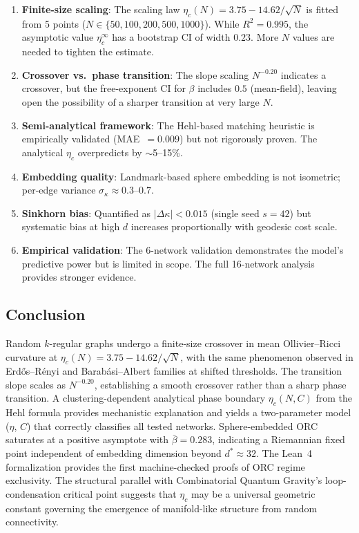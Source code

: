 \documentclass[11pt,a4paper]{article}
\newcommand{\etac}{\eta_c}
\begin{document}
\begin{enumerate}
    \item \textbf{Finite-size scaling}: The scaling law $\etac(N) = 3.75 - 14.62/\sqrt{N}$ is fitted from 5 points ($N \in \{50, 100, 200, 500, 1000\}$). While $R^2 = 0.995$, the asymptotic value $\eta_c^\infty$ has a bootstrap CI of width $0.23$. More $N$ values are needed to tighten the estimate.
    \item \textbf{Crossover vs.\ phase transition}: The slope scaling $N^{-0.20}$ indicates a crossover, but the free-exponent CI for $\beta$ includes $0.5$ (mean-field), leaving open the possibility of a sharper transition at very large $N$.
    \item \textbf{Semi-analytical framework}: The Hehl-based matching heuristic is empirically validated (MAE~$= 0.009$) but not rigorously proven. The analytical $\etac$ overpredicts by $\sim$5--15\%.
    \item \textbf{Embedding quality}: Landmark-based sphere embedding is not isometric; per-edge variance $\sigma_\kappa \approx 0.3$--$0.7$.
    \item \textbf{Sinkhorn bias}: Quantified as $|\Delta\kappa| < 0.015$ (single seed $s=42$) but systematic bias at high $d$ increases proportionally with geodesic cost scale.
    \item \textbf{Empirical validation}: The 6-network validation demonstrates the model's predictive power but is limited in scope. The full 16-network analysis~\cite{paper2} provides stronger evidence.
\end{enumerate}

\subsection{Conclusion}

Random $k$-regular graphs undergo a finite-size crossover in mean Ollivier--Ricci curvature at $\etac(N) = 3.75 - 14.62/\sqrt{N}$, with the same phenomenon observed in Erd\H{o}s--R\'enyi and Barab\'asi--Albert families at shifted thresholds. The transition slope scales as $N^{-0.20}$, establishing a smooth crossover rather than a sharp phase transition. A clustering-dependent analytical phase boundary $\etac(N, C)$ from the Hehl formula provides mechanistic explanation and yields a two-parameter model ($\eta$, $C$) that correctly classifies all tested networks. Sphere-embedded ORC saturates at a positive asymptote with $\bar{\beta} = 0.283$, indicating a Riemannian fixed point independent of embedding dimension beyond $d^* \approx 32$. The Lean~4 formalization provides the first machine-checked proofs of ORC regime exclusivity. The structural parallel with Combinatorial Quantum Gravity's loop-condensation critical point suggests that $\etac$ may be a universal geometric constant governing the emergence of manifold-like structure from random connectivity.
\end{document}
